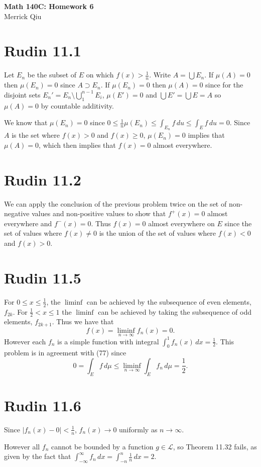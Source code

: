 \documentclass{article}
\begin{document}
\begin{center}
	\huge{\bf Math 140C: Homework 6} \\
	Merrick Qiu
\end{center}

\section*{Rudin 11.1}
Let $E_n$ be the subset of $E$ on which $f(x) > \frac{1}{n}$.
Write $A = \bigcup E_n$.
If $\mu(A) = 0$ then $\mu(E_n) = 0$ since $A \supset E_n$.
If $\mu(E_n) = 0$ then $\mu(A) = 0$ since for the disjoint sets 
$E_n' = E_n \setminus \bigcup_1^{n-1} E_i$, $\mu(E') = 0$ and $\bigcup E' = \bigcup E = A$ so $\mu(A) = 0$ by countable additivity.


We know that $\mu(E_n) = 0$ since $0 \leq \frac{1}{n}\mu(E_n) \leq\int_{E_n} f \,du \leq \int_E f \,du = 0$.
Since $A$ is the set where $f(x) > 0$ and $f(x) \geq 0$, $\mu(E_n) = 0$ implies that 
$\mu(A) = 0$, which then implies that $f(x) = 0$ almost everywhere.
\newpage 

\section*{Rudin 11.2}
We can apply the conclusion of the previous problem twice on 
the set of non-negative values and non-positive values to show that 
$f^+(x) = 0$ almost everywhere and $f^-(x) = 0$.  
Thus $f(x) = 0$ almost everywhere on $E$ since the 
set of values where $f(x) \neq 0$ is the union of the set of values where
$f(x) < 0$ and $f(x) > 0$.
\newpage 

\section*{Rudin 11.5}
For $0 \leq x \leq \frac{1}{2}$, the $\liminf$ can be achieved by the subsequence of even elements, $f_{2k}$. 
For $\frac{1}{2} < x \leq 1$  the $\liminf$ can be achieved by taking the subsequence of odd elements, $f_{2k+1}$.
Thus we have that
\[
	f(x) = \liminf_{n \to \infty} f_n(x) = 0.
\]
However each $f_n$ is a simple function with integral 
$\int_0^1 f_n(x) \,dx = \frac{1}{2}$.
This problem is in agreement with (77) since
\[
	0 = \int_E f \,d\mu \leq \liminf_{n\to \infty} \int_E f_n \,d\mu = \frac{1}{2}. 
\]
\newpage 

\section*{Rudin 11.6}
Since $|f_n(x) - 0| < \frac{1}{n}$, $f_n(x) \to 0$
uniformly as $n \to \infty$.

However all $f_n$ cannot be bounded by a function $g \in \mathscr{L}$,
so Theorem 11.32 fails, as given by the fact that
$\int_{- \infty}^\infty f_n \,dx = \int_{-n}^n \frac{1}{n} \,dx = 2$.
\newpage
\end{document}
